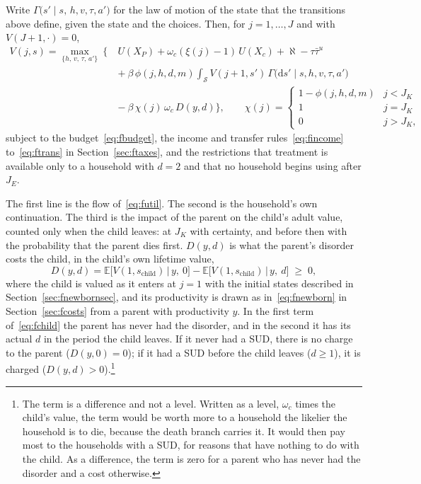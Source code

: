 \documentclass[10pt]{article}
\begin{document}
Write $\Gamma\big(s'\mid s,\,h,v,\tau,a'\big)$ for the law of motion of the state that the transitions above define, given the state and the choices. Then, for $j=1,\dots,J$ and with $V(J{+}1,\cdot)=0$,
\begin{equation}\label{eq:fbellman}
\begin{aligned}
V(j,s)=\max_{\{h,\,v,\,\tau,\,a'\}}\ \Bigg\{\
&U(X_P)+\omega_c(\xi(j)-1)\,U(X_c)+\aleph-\tau\bar\tau^{u}\\[2pt]
&+\ \beta\,\phi(j,h,d,m)\!\int_{\mathcal S}\! V(j{+}1,s')\,
\Gamma\big(\mathrm{d}s'\mid s,h,v,\tau,a'\big)\\[2pt]
&-\ \beta\,\chi(j)\,\omega_c\,D(y,d)\Bigg\},
\qquad
\chi(j)=\begin{cases}1-\phi(j,h,d,m) & j<J_K\\ 1 & j=J_K\\ 0 & j>J_K,\end{cases}
\end{aligned}
\end{equation}
subject to the budget~\eqref{eq:fbudget}, the income and transfer
rules~\eqref{eq:fincome} to~\eqref{eq:ftrans} in Section~\ref{sec:ftaxes}, and the restrictions that treatment is
available only to a household with $d=2$ and that no household begins using after $J_E$.

The first line is the flow of~\eqref{eq:futil}. The second is the household's own
continuation. The third is the impact of the parent on the child's adult value, counted only when the child leaves: at
$J_K$ with certainty, and before then with the probability that the parent dies first.
$D(y,d)$ is what the parent's disorder costs the child, in the child's own lifetime value,
\begin{equation}\label{eq:fchild}
D(y,d)=\mathbb{E}\big[V(1,s_{\text{child}})\,\big|\,y,\ 0\big]
-\mathbb{E}\big[V(1,s_{\text{child}})\,\big|\,y,\ d\big]\;\ge\;0,
\end{equation}
where the child is valued as it enters at $j=1$ with the initial states described in Section~\ref{sec:fnewbornsec}, and its productivity is drawn as
in~\eqref{eq:fnewborn} in Section~\ref{sec:fcosts} from a parent with productivity $y$. In the first term of~\eqref{eq:fchild} the parent has never had the disorder, and in the second it has its actual $d$ in the period the child leaves. If it never had a SUD, there is no charge to the parent ($D(y,0)=0$); if it had a SUD before the child leaves ($d\ge1$), it is charged ($D(y,d)>0$).\footnote{The term is a difference and not a level. Written as a level, $\omega_c$ times the child's value, the term would be worth more to a household the likelier the household is to die, because the death branch carries it. It would then pay most to the households with a SUD, for reasons that have nothing to do with the child. As a difference, the term is zero for a parent who has never had the disorder and a cost otherwise.}
\end{document}

